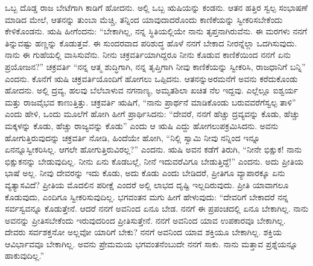 ಒಬ್ಬ ದೊಡ್ಡ ರಾಜ ಬೇಟೆಗಾಗಿ ಕಾಡಿಗೆ ಹೋದನು. ಅಲ್ಲಿ ಒಬ್ಬ ಋಷಿಯನ್ನು ಕಂಡನು. ಆತನ ಹತ್ತಿರ ಸ್ವಲ್ಪ ಸಂಭಾಷಣೆ ಮಾಡಿದ ಮೇಲೆ, ಆತನನ್ನು ತುಂಬಾ ಮೆಚ್ಚಿ, ತನ್ನಿಂದ ಯಾವುದಾದರೊಂದು ಕಾಣಿಕೆಯನ್ನು ಸ್ವೀಕರಿಸಬೇಕೆಂದು ಕೇಳಿಕೊಂಡನು. ಋಷಿ ಹೀಗೆಂದನು: “ಬೇಕಾಗಿಲ್ಲ, ನನ್ನ ಸ್ಥಿತಿಯಲ್ಲಿಯೇ ನಾನು ತೃಪ್ತನಾಗಿರುವೆನು. ಈ ಮರಗಳು ನನಗೆ ತಿನ್ನುವಷ್ಟು ಹಣ್ಣನ್ನು ಕೊಡುತ್ತವೆ. ಈ ಸುಂದರವಾದ ಪರಿಶುದ್ಧ ಹೊಳೆ ನನಗೆ ಬೇಕಾದ ನೀರನ್ನೆಲ್ಲಾ ಒದಗಿಸುವುದು. ನಾನು ಈ ಗುಹೆಯಲ್ಲಿ ವಾಸಿಸುವೆನು. ನೀನು ಚಕ್ರವರ್ತಿಯಾಗಿದ್ದರೂ ನೀನು ಕೊಡುವ ಕಾಣಿಕೆಯಿಂದ ನನಗೆ ಏನು ಪ್ರಯೋಜನ?” ಚಕ್ರವರ್ತಿ “ನನ್ನ ಆತ್ಮ ಶುದ್ಧಿಗಾಗಿ, ನನ್ನ ತೃಪ್ತಿಗಾಗಿ ನೀವು ಕಾಣಿಕೆಯನ್ನು ಸ್ವೀಕರಿಸಿ, ರಾಜಧಾನಿಗೆ ಬನ್ನಿ” ಎಂದನು. ಕೊನೆಗೆ ಋಷಿ ಚಕ್ರವರ್ತಿಯೊಂದಿಗೆ ಹೋಗಲು ಒಪ್ಪಿದನು. ಆತನನ್ನು\break ಅರಮನೆಗೆ ಅವನು ಕರೆದುಕೊಂಡು ಹೋದನು. ಅಲ್ಲಿ ದ್ರವ್ಯ, ಹಲವು ಬೆಲೆಬಾಳುವ ನಗನಾಣ್ಯ, ಅಮೃತಶಿಲಾ ಖಚಿತ ನೆಲ ಇದ್ದವು. ಎಲ್ಲೆಲ್ಲೂ ಐಶ್ವರ್ಯ ಮತ್ತು ರಾಜವೈಭವ ಕಾಣುತ್ತಿತ್ತು. ಚಕ್ರವರ್ತಿ ಋಷಿಗೆ, “ನಾನು ಪ್ರಾರ್ಥನೆ ಮಾಡಿಕೊಂಡು ಬರುವವರೆಗೆ\break ಸ್ವಲ್ಪ ತಾಳಿ” ಎಂದು ಹೇಳಿ, ಒಂದು ಮೂಲೆಗೆ ಹೋಗಿ ಹೀಗೆ ಪ್ರಾರ್ಥಿಸಿದನು: “ದೇವರೆ, ನನಗೆ ಹೆಚ್ಚು ದ್ರವ್ಯವನ್ನು ಕೊಡು, ಹೆಚ್ಚು ಮಕ್ಕಳನ್ನು ಕೊಡು, ಹೆಚ್ಚು ರಾಜ್ಯವನ್ನು ಕೊಡು” ಎಂದು ಆ ಋಷಿ ಎದ್ದು ಹೋಗಲುಪಕ್ರಮಿಸಿದನು. ಅವನು ಹೋಗುತ್ತಿರುವುದನ್ನು ಚಕ್ರವರ್ತಿ ನೋಡಿ, ಹಿಂದೆಯೇ ಹೋಗಿ, “ನಿಲ್ಲಿ ಸ್ವಾಮಿ ನೀವು ನನ್ನಿಂದ ಇನ್ನೂ ಏನನ್ನೂ\break ಸ್ವೀಕರಿಸಿಲ್ಲ. ಆಗಲೇ ಹೋಗುತ್ತಿರುವಿರಲ್ಲ?” ಎಂದನು. ಋಷಿ ಅವನ ಕಡೆಗೆ ತಿರುಗಿ, “ನೀನೇ ಭಿಕ್ಷುಕ! ನಾನು ಭಿಕ್ಷುಕನನ್ನು ಬೇಡುವುದಿಲ್ಲ. ನೀನು ಏನು ಕೊಡಬಲ್ಲೆ, ನೀನೆ ಇದುವರೆವಿಗೂ ಬೇಡುತ್ತಿದ್ದೆ!” ಎಂದನು. ಅದು ಪ್ರೀತಿಯ ಭಾಷೆ ಅಲ್ಲ. ನೀವು ದೇವರನ್ನು ಇದು ಕೊಡು, ಅದು ಕೊಡು ಎಂದು ಬೇಡಿದರೆ, ಪ್ರೀತಿಗೂ ವ್ಯಾಪಾರಕ್ಕೂ ಏನು ವ್ಯತ್ಯಾಸವಿದೆ? ಪ್ರೀತಿಯ ಮೊದಲಿನ ಪರೀಕ್ಷೆ ಎಂದರೆ ಅಲ್ಲಿ ಲಾಭದ ದೃಷ್ಟಿ ಇಲ್ಲದಿರುವುದು. ಪ್ರೀತಿ ಯಾವಾಗಲೂ ಕೊಡುವುದು, ಎಂದಿಗೂ ಸ್ವೀಕರಿಸುವುದಿಲ್ಲ. ಭಗವಂತನ ಮಗು ಹೀಗೆ ಹೇಳುವುದು: “ದೇವರಿಗೆ ಬೇಕಾದರೆ ನನ್ನ ಸರ್ವಸ್ವವನ್ನೂ ಕೊಡುತ್ತೇನೆ. ಆದರೆ ನನಗೆ ಅವನಿಂದ ಏನೂ ಬೇಡ. ನನಗೆ ಈ ಪ್ರಪಂಚದಲ್ಲಿ ಏನೂ ಬೇಕಾಗಿಲ್ಲ. ನಾನು ಅವನನ್ನು ಪ್ರೀತಿಸಬೇಕೆಂದು ಇರುವುದರಿಂದ ಪ್ರೀತಿಸುತ್ತೇನೆ. ನನಗೆ ಅವನಿಂದ ಯಾವ ಉಪಕಾರವೂ ಬೇಕಾಗಿಲ್ಲ. ದೇವರು ಸರ್ವಶಕ್ತನೋ ಅಲ್ಲವೋ ಯಾರಿಗೆ ಬೇಕು? ನನಗೆ ಅವನಿಂದ ಯಾವ ಶಕ್ತಿಯೂ ಬೇಕಾಗಿಲ್ಲ. ಶಕ್ತಿಯ ಆವಿರ್ಭಾವವೂ ಬೇಕಾಗಿಲ್ಲ. ಅವನು ಪ್ರೇಮಮಯ ಭಗವಂತನೆಂಬುದೇ ನನಗೆ ಸಾಕು. ನಾನು ಮತ್ತಾವ ಪ್ರಶ್ನೆಯನ್ನೂ ಹಾಕುವುದಿಲ್ಲ.”

